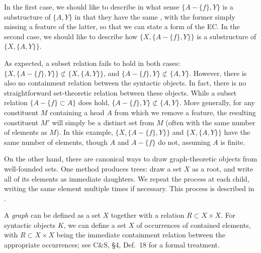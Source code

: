\documentclass[output=paper]{langsci/langscibook}
\begin{document}
In the first case, we should like to describe in what sense $\{A-\{f\},Y\}$ is
a substructure of $\{A,Y\}$ in that they have the same ,
with the former simply missing a feature of the latter, so that we can state a
form of the \gls{EC}. In the second case, we should
like to describe how $\{X,\{A-\{f\},Y\}\}$ is a substructure of
$\{X,\{A,Y\}\}$.

As expected, a subset relation fails to hold in both cases:
$\{X,\{A-\{f\},Y\}\}\not\subset\{X,\{A,Y\}\}$, and
$\{A-\{f\},Y\}\not\subset\{A,Y\}$. However, there is also no containment
relation between the syntactic objects. In fact, there is no straightforward
set-theoretic relation between these objects. While a subset relation
$\{A-\{f\}\subset A\}$ does hold, $\{A-\{f\},Y\}\not\subset\{A,Y\}$. More
generally, for any constituent $M$ containing a head $A$ from which we remove a
feature, the resulting constituent $M'$ will simply be a distinct set
from $M$ (often with the same number of elements as $M$). In this example,
$\{X,\{A-\{f\},Y\}\}$ and $\{X,\{A,Y\}\}$ have the same number of elements,
though $A$ and $A-\{f\}$ do not, assuming $A$ is finite.

On the other hand, there are canonical ways to draw graph-theoretic objects
from well-founded sets. One method produces trees: draw a set $X$ as a root,
and write all of its elements as immediate daughters. We repeat the process at
each child, writing the same element multiple times if necessary. This process
is described in \cite{aczel}.

\ea\label{ex:key:aczel}
    \hspace*{-.75cm}
\z

A \emph{graph} can be defined as a set $X$ together with a relation $R\subset
X\times X$. For syntactic objects $K$, we can define a set $X$ of occurrences
of contained elements, with $R\subset X\times X$ being the immediate
containment relation between the appropriate occurrences; see
C\&S\nocite{ColSta2016}, \S 4, Def.\ 18 for a formal treatment.
\end{document}
